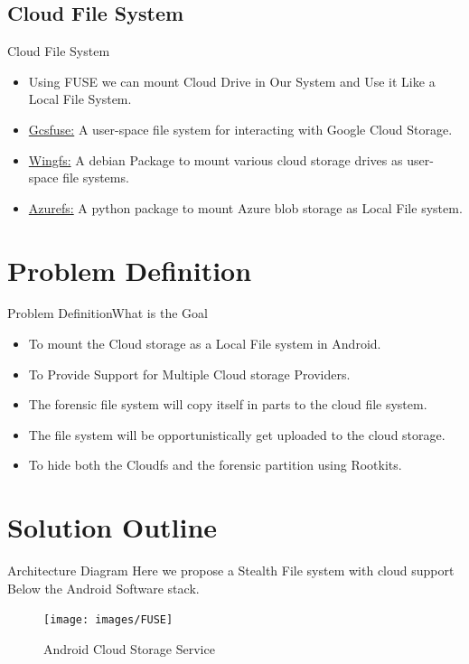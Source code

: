 \documentclass{beamer}
\begin{document}
\subsection{Cloud File System}
\begin{frame}{Cloud File System}
	\begin{itemize}
	\item{Using FUSE we can mount Cloud Drive in Our System and Use it Like a Local File System.
	}
	\bigskip
	
	 \item \href{https://github.com/GoogleCloudPlatform/gcsfuse}{Gcsfuse:} A user-space file system for interacting with Google Cloud Storage.
	 \bigskip
	 
	 \item \href{http://www.archiware.com/products/wingfs}{Wingfs:} A debian Package to mount various cloud storage drives as user-space file systems.
	 \bigskip 
	 \item \href{https://ahmetalpbalkan.com/blog/introducing-azurefs/}{Azurefs:} A python package to mount Azure blob storage as Local File system.
	 \end{itemize}	   	
\end{frame}

\section{Problem Definition}
\begin{frame}{Problem Definition}{What is the Goal}
\begin{itemize}
\item To mount the Cloud storage as a Local File system in Android.
\item To Provide Support for Multiple Cloud storage Providers.
\item The forensic file system will copy itself in parts to the cloud file system.
\item The file system will be opportunistically get uploaded to the cloud storage.

\item To hide both the Cloudfs and the forensic partition using Rootkits.
\end{itemize}
\end{frame}
\section{Solution Outline}
\begin{frame}{Architecture Diagram}
Here we propose a Stealth File system with cloud support Below the Android Software
stack.
\begin{figure}
\centering

\texttt{[image: images/FUSE]}
\caption{Android Cloud Storage Service}
\label{imageLabel}
\end{figure}
\end{frame}
\end{document}
